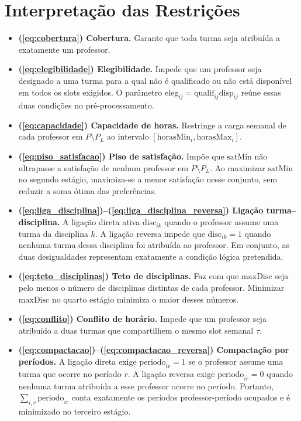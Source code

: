 \documentclass[11pt,a4paper]{article}
\begin{document}
\section{Interpretação das Restrições}
\begin{itemize}
  \item \textbf{(\ref{eq:cobertura}) Cobertura.} Garante que toda turma seja atribuída a exatamente um professor.
  \item \textbf{(\ref{eq:elegibilidade}) Elegibilidade.} Impede que um professor seja designado a uma turma para a qual não é qualificado ou não está disponível em todos os slots exigidos. O parâmetro $\mathrm{eleg}_{ij}=\mathrm{qualif}_{ij}\mathrm{disp}_{ij}$ reúne essas duas condições no pré-processamento.
  \item \textbf{(\ref{eq:capacidade}) Capacidade de horas.} Restringe a carga semanal de cada professor em $P\setminus P_L$ ao intervalo $[\mathrm{horasMin}_{i},\mathrm{horasMax}_{i}]$.
  \item \textbf{(\ref{eq:piso_satisfacao}) Piso de satisfação.} Impõe que $\mathrm{satMin}$ não ultrapasse a satisfação de nenhum professor em $P\setminus P_L$. Ao maximizar $\mathrm{satMin}$ no segundo estágio, maximiza-se a menor satisfação nesse conjunto, sem reduzir a soma ótima das preferências.
  \item \textbf{(\ref{eq:liga_disciplina})--(\ref{eq:liga_disciplina_reversa}) Ligação turma--disciplina.} A ligação direta ativa $\mathrm{disc}_{ik}$ quando o professor assume uma turma da disciplina $k$. A ligação reversa impede que $\mathrm{disc}_{ik}=1$ quando nenhuma turma dessa disciplina foi atribuída ao professor. Em conjunto, as duas desigualdades representam exatamente a condição lógica pretendida.
  \item \textbf{(\ref{eq:teto_disciplinas}) Teto de disciplinas.} Faz com que $\mathrm{maxDisc}$ seja pelo menos o número de disciplinas distintas de cada professor. Minimizar $\mathrm{maxDisc}$ no quarto estágio minimiza o maior desses números.
  \item \textbf{(\ref{eq:conflito}) Conflito de horário.} Impede que um professor seja atribuído a duas turmas que compartilhem o mesmo slot semanal $\tau$.
  \item \textbf{(\ref{eq:compactacao})--(\ref{eq:compactacao_reversa}) Compactação por períodos.} A ligação direta exige $\mathrm{periodo}_{ir}=1$ se o professor assume uma turma que ocorre no período $r$. A ligação reversa exige $\mathrm{periodo}_{ir}=0$ quando nenhuma turma atribuída a esse professor ocorre no período. Portanto, $\sum_{i,r}\mathrm{periodo}_{ir}$ conta exatamente os períodos professor-período ocupados e é minimizado no terceiro estágio.
\end{itemize}
\end{document}
